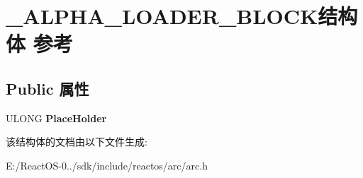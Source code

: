\hypertarget{struct___a_l_p_h_a___l_o_a_d_e_r___b_l_o_c_k}{}\section{\+\_\+\+A\+L\+P\+H\+A\+\_\+\+L\+O\+A\+D\+E\+R\+\_\+\+B\+L\+O\+C\+K结构体 参考}
\label{struct___a_l_p_h_a___l_o_a_d_e_r___b_l_o_c_k}
\subsection*{Public 属性}
\begin{DoxyCompactItemize}
\item 
\mbox{\label{struct___a_l_p_h_a___l_o_a_d_e_r___b_l_o_c_k_a36780f599f565a454eb552d1c921b698}} 
U\+L\+O\+NG {\bfseries Place\+Holder}
\end{DoxyCompactItemize}


该结构体的文档由以下文件生成\+:\begin{DoxyCompactItemize}
\item 
E\+:/\+React\+O\+S-\/0../sdk/include/reactos/arc/arc.\+h\end{DoxyCompactItemize}
